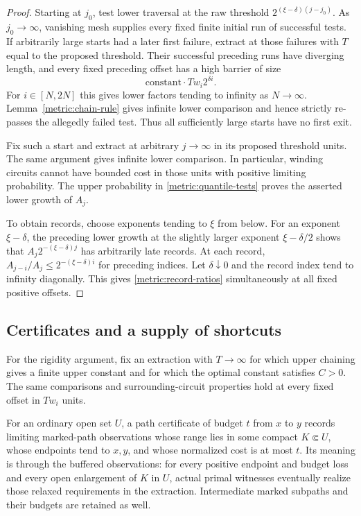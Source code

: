 \begin{proof}
Starting at $j_0$, test lower traversal at the raw threshold
$2^{(\xi-\delta)(j-j_0)}$. As $j_0\to\infty$, vanishing mesh supplies every
fixed finite initial run of successful tests. If arbitrarily large starts
had a later first failure, extract at those failures with $T$ equal to the
proposed threshold. Their successful preceding runs have diverging length,
and every fixed preceding offset has a high barrier of size
\[
 \text{constant}\cdot Tw_i2^{\delta i}.
\]
For $i\in[N,2N]$ this gives lower factors tending to infinity as $N\to\infty$.
Lemma~\ref{metric:chain-rule} gives infinite lower comparison and hence
strictly re-passes the allegedly failed test. Thus all sufficiently large
starts have no first exit.

Fix such a start and extract at arbitrary $j\to\infty$ in its proposed
threshold units. The same argument gives infinite lower comparison. In
particular, winding circuits cannot have bounded cost in those units with
positive limiting probability. The upper probability in
\eqref{metric:quantile-tests} proves the asserted lower growth of $A_j$.

To obtain records, choose exponents tending to $\xi$ from below. For an
exponent $\xi-\delta$, the preceding lower growth at the slightly larger
exponent $\xi-\delta/2$ shows that
$A_j2^{-(\xi-\delta)j}$ has arbitrarily late records. At each record,
$A_{j-i}/A_j\le2^{-(\xi-\delta)i}$ for preceding indices. Let $\delta\downarrow0$
and the record index tend to infinity diagonally. This gives
\eqref{metric:record-ratios} simultaneously at all fixed positive offsets.
\end{proof}

\subsection{Certificates and a supply of shortcuts}

For the rigidity argument, fix an extraction with $T\to\infty$ for which
upper chaining gives a finite upper constant and for which the optimal
constant satisfies $C>0$. The same comparisons and surrounding-circuit
properties hold at every fixed offset in $Tw_i$ units.

For an ordinary open set \(U\), a path certificate of budget \(t\)
from \(x\) to \(y\) records limiting marked-path observations whose
range lies in some compact \(K\Subset U\), whose endpoints tend to
\(x,y\), and whose normalized cost is at most \(t\). Its meaning is
through the buffered observations: for every positive endpoint and budget
loss and every open enlargement of \(K\) in \(U\), actual primal
witnesses eventually realize those relaxed requirements in the extraction.
Intermediate marked subpaths and their budgets are retained as well.

